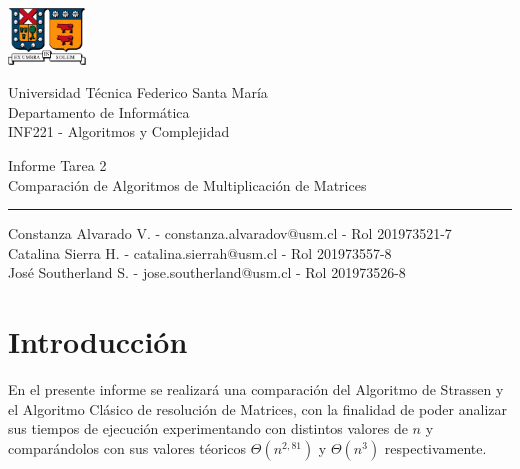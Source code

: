 \documentclass[a4paper,11pt]{article}
\begin{document}

\thispagestyle{empty} %

  \begin{minipage}{.2\linewidth}
    \begin{flushleft}
      \includegraphics[height = 1.5cm]{Imagenes/UTFSM.jpg}
    \end{flushleft}
  \end{minipage}
  \hfill
  \begin{minipage}{.7\linewidth}
    \begin{flushright}
        Universidad Técnica Federico Santa María \\
        Departamento de Informática\\
        INF221 - Algoritmos y Complejidad\\
    \end{flushright}
  \end{minipage}

\vfill %
\begin{center}
	{\Large Informe Tarea 2\\}
	{\huge Comparación de Algoritmos de Multiplicación de Matrices\\}
	\vspace{.5cm}
	\hrule
	\vspace{.5cm}
    {\large Constanza Alvarado V.} - constanza.alvaradov@usm.cl - Rol 201973521-7\\
    {\large Catalina Sierra H.} - catalina.sierrah@usm.cl - Rol 201973557-8\\
	{\large José Southerland S.} - jose.southerland@usm.cl - Rol 201973526-8\\
	
\end{center}
\vfill
\newpage
\section{Introducción}
En el presente informe se realizará una comparación del Algoritmo de Strassen y el Algoritmo Clásico de resolución de Matrices, con la finalidad de poder analizar sus tiempos de ejecución experimentando con distintos valores de $n$ y comparándolos con sus valores téoricos $\Theta(n^{2,81})$ y $\Theta(n^3)$ respectivamente.
\end{document}
